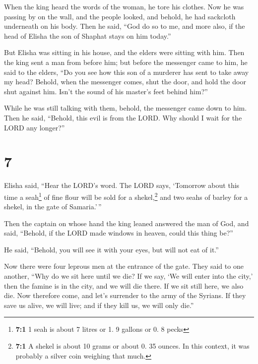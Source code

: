  When the king heard the words of the woman, he tore his
clothes. Now he was passing by on the wall, and the people looked, and
behold, he had sackcloth underneath on his body.  Then he
said, ``God do so to me, and more also, if the head of Elisha the son of
Shaphat stays on him today.''

 But Elisha was sitting in his house, and the elders were
sitting with him. Then the king sent a man from before him; but before
the messenger came to him, he said to the elders, ``Do you see how this
son of a murderer has sent to take away my head? Behold, when the
messenger comes, shut the door, and hold the door shut against him.
Isn't the sound of his master's feet behind him?''

 While he was still talking with them, behold, the
messenger came down to him. Then he said, ``Behold, this evil is from
the LORD. Why should I wait for the LORD any longer?''

\hypertarget{section-6}{%
\section{7}\label{section-6}}

 Elisha said, ``Hear the LORD's word. The LORD says,
`Tomorrow about this time a seah\footnote{\textbf{7:1} 1 seah is about 7
  litres or 1. 9 gallons or 0. 8 pecks} of fine flour will be sold for a
shekel,\footnote{\textbf{7:1} A shekel is about 10 grams or about 0. 35
  ounces. In this context, it was probably a silver coin weighing that
  much.} and two seahs of barley for a shekel, in the gate of
Samaria.'\,''

 Then the captain on whose hand the king leaned answered
the man of God, and said, ``Behold, if the LORD made windows in heaven,
could this thing be?''

He said, ``Behold, you will see it with your eyes, but will not eat of
it.''

 Now there were four leprous men at the entrance of the
gate. They said to one another, ``Why do we sit here until we die?
 If we say, `We will enter into the city,' then the famine
is in the city, and we will die there. If we sit still here, we also
die. Now therefore come, and let's surrender to the army of the Syrians.
If they save us alive, we will live; and if they kill us, we will only
die.''

